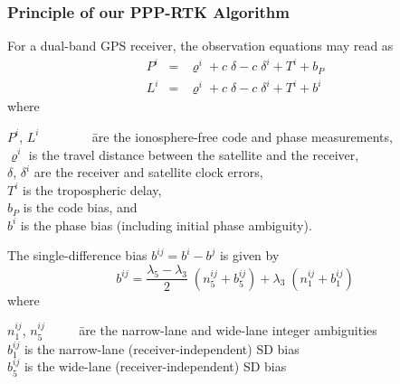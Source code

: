 \documentclass[10pt]{beamer}
\begin{document}

\begin{frame}
  \frametitle{Principle of our PPP-RTK Algorithm}
  For a dual-band GPS receiver, the observation equations may read as
  \begin{eqnarray*}
  P^i & = & \varrho^i + c\;\delta - c\;\delta^i + T^i + b_P              \\
  L^i & = & \varrho^i + c\;\delta - c\;\delta^i + T^i + b^i
  \end{eqnarray*}
  where
  \begin{tabbing}
  $P^i$, $L^i$ ~~~~~~~ \= are the ionosphere-free code and phase measurements, \\ 
  $\varrho^i$          \> is the travel distance between the satellite 
                          and the receiver,                               \\
  $\delta$, $\delta^i$ \> are the receiver and satellite clock errors,    \\
  $T^i$                \> is the tropospheric delay,                      \\
  $b_P$                \> is the code bias, and                           \\
  $b^i$                \> is the phase bias (including initial
                          phase ambiguity).
  \end{tabbing}
  The single-difference bias $b^{ij} = b^i - b^j$ is given by
  \begin{displaymath}
  b^{ij} = \displaystyle\frac{\lambda_5-\lambda_3}{2}\;(n_5^{ij} + b_5^{ij})
              + \lambda_3\;(n_1^{ij} + b_1^{ij}) 
  \end{displaymath}
   where
  \begin{tabbing}
  $n_1^{ij}$, $n_5^{ij}$ ~~~~ \= are the narrow-lane and wide-lane integer ambiguities \\
  $b_1^{ij}$                 \> is the narrow-lane (receiver-independent) SD bias \\
  $b_5^{ij}$                 \> is the wide-lane (receiver-independent) SD bias
  \end{tabbing}
\end{frame}

\end{document}
